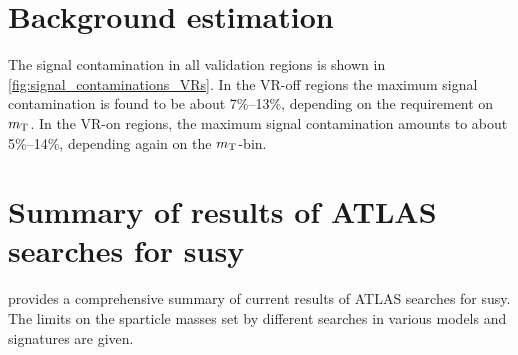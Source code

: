 \graphicspath{{chapter-background/Figs/}}

\section{Background estimation}\label{app:background_estimation}

The signal contamination in all validation regions is shown in \cref{fig:signal_contaminations_VRs}. In the VR-off regions the maximum signal contamination is found to be about 7\%--13\%, depending on the requirement on $m_{\textrm{T}}$. In the VR-on regions, the maximum signal contamination amounts to about 5\%--14\%, depending again on the $m_{\textrm{T}}$-bin.


\section{Summary of results of ATLAS searches for \gls{susy}}\label{sec:susy_summary_plot}

 provides a comprehensive summary of current results of ATLAS searches for \gls{susy}. The limits on the sparticle masses set by different searches in various models and signatures are given.

